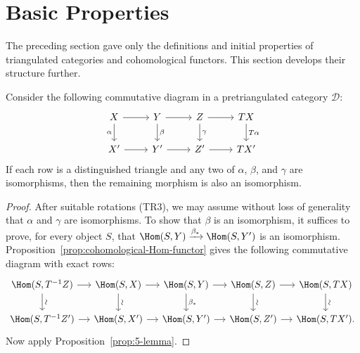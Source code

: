
\section{Basic Properties}\label{sec:triangular-basic}
\hypertarget{o014.aljabr2.chapter4.triangulated-basics}{ }

The preceding section gave only the definitions and initial properties of
triangulated categories and cohomological functors. This section develops
their structure further.

\begin{proposition}\label{prop:dt-3-2}
	Consider the following commutative diagram in a pretriangulated category
	$\mathcal{D}$:
	\[\begin{tikzcd}
		X \arrow[r] \arrow[d, "\alpha"'] & Y \arrow[d, "\beta"] \arrow[r] & Z \arrow[d, "\gamma"] \arrow[r] & TX \arrow[d, "T\alpha"] \\
		X' \arrow[r] & Y' \arrow[r] & Z' \arrow[r] & TX'
	\end{tikzcd}\]
	If each row is a distinguished triangle and any two of $\alpha$, $\beta$,
	and $\gamma$ are isomorphisms, then the remaining morphism is also an
	isomorphism.
\end{proposition}

\begin{proof}
	After suitable rotations (TR3), we may assume without loss of generality
	that $\alpha$ and $\gamma$ are isomorphisms. To show that $\beta$ is an
	isomorphism, it suffices to prove, for every object $S$, that
	$\Hom(S, Y) \xrightarrow{\beta_*} \Hom(S, Y')$ is an isomorphism.
	Proposition~\ref{prop:cohomological-Hom-functor} gives the following
	commutative diagram with exact rows:
	\[\begin{tikzcd}[column sep=small]
		\Hom(S, T^{-1} Z) \arrow[d, "\sim" sloped] \arrow[r] & \Hom(S, X) \arrow[r] \arrow[d, "\sim" sloped] & \Hom(S,Y) \arrow[d, "{\beta_*}"] \arrow[r] & \Hom(S,Z) \arrow[d, "\sim" sloped] \arrow[r] & \Hom(S, TX) \arrow[d, "\sim" sloped] \\
		\Hom(S, T^{-1} Z') \arrow[r] & \Hom(S, X') \arrow[r] & \Hom(S, Y') \arrow[r] & \Hom(S, Z') \arrow[r] & \Hom(S, TX') .
	\end{tikzcd}\]
	Now apply Proposition~\ref{prop:5-lemma}.
\end{proof}


